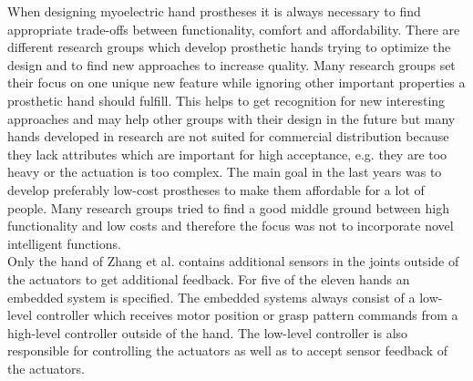 \documentclass[a4paper, 10pt, conference]{ieeeconf}      %
\begin{document}
When designing myoelectric hand prostheses it is always necessary to find appropriate trade-offs between functionality, comfort and affordability. There are different research groups which develop prosthetic hands trying to optimize the design and to find new approaches to increase quality. Many research groups set their focus on one unique new feature while ignoring other important properties a prosthetic hand should fulfill. This helps to get recognition for new interesting approaches and may help other groups with their design in the future but many hands developed in research are not suited for commercial distribution because they lack attributes which are important for high acceptance, e.g. they are too heavy or the actuation is too complex. The main goal in the last years was to develop preferably low-cost prostheses to make them affordable for a lot of people. Many research groups tried to find a good middle ground between high functionality and low costs and therefore the focus was not to incorporate novel intelligent functions.\\
Only the hand of Zhang et al. contains additional sensors in the joints outside of the actuators to get additional feedback. For five of the eleven hands an embedded system is specified. The embedded systems always consist of a low-level controller which receives motor position or grasp pattern commands from a high-level controller outside of the hand. The low-level controller is also responsible for controlling the actuators as well as to accept sensor feedback of the actuators.

\newpage



%
\end{document}
